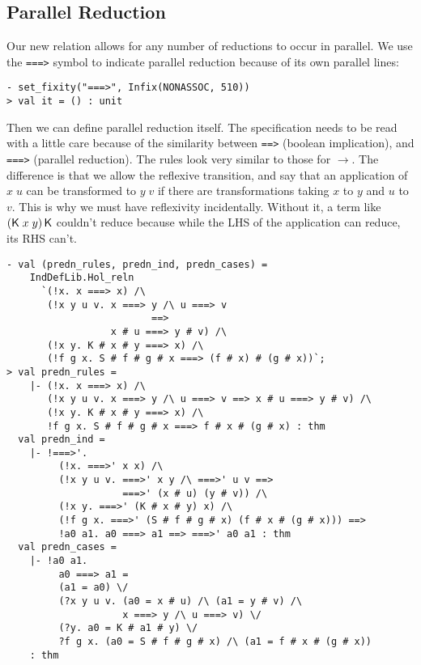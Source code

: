 \documentclass[12pt]{article}
\newcommand{\KC}{\con{K}}
\begin{document}
\subsection{Parallel Reduction}
\label{sec:Parallel-Reduction}

Our new relation allows for any number of reductions to occur in
parallel.  We use the \texttt{===>} symbol to indicate parallel
reduction because of its own parallel lines:
\begin{session}\begin{verbatim}
- set_fixity("===>", Infix(NONASSOC, 510))
> val it = () : unit
\end{verbatim}\end{session}
    Then we can define parallel reduction itself.  The specification
    needs to be read with a little care because of the similarity
    between \texttt{==>} (boolean implication), and \texttt{===>}
    (parallel reduction).  The rules look very similar to those for
    $\rightarrow$.  The difference is that we allow the reflexive
    transition, and say that an application of $x\;u$ can be
    transformed to $y\;v$ if there are transformations taking $x$ to
    $y$ and $u$ to $v$.  This is why we must have reflexivity
    incidentally.  Without it, a term like $(\KC\;x\;y)\,\KC$ couldn't
    reduce because while the LHS of the application can reduce, its
    RHS can't.
\begin{session}\begin{verbatim}
- val (predn_rules, predn_ind, predn_cases) =
    IndDefLib.Hol_reln
      `(!x. x ===> x) /\
       (!x y u v. x ===> y /\ u ===> v
                         ==>
                  x # u ===> y # v) /\
       (!x y. K # x # y ===> x) /\
       (!f g x. S # f # g # x ===> (f # x) # (g # x))`;
> val predn_rules =
    |- (!x. x ===> x) /\
       (!x y u v. x ===> y /\ u ===> v ==> x # u ===> y # v) /\
       (!x y. K # x # y ===> x) /\
       !f g x. S # f # g # x ===> f # x # (g # x) : thm
  val predn_ind =
    |- !===>'.
         (!x. ===>' x x) /\
         (!x y u v. ===>' x y /\ ===>' u v ==>
                    ===>' (x # u) (y # v)) /\
         (!x y. ===>' (K # x # y) x) /\
         (!f g x. ===>' (S # f # g # x) (f # x # (g # x))) ==>
         !a0 a1. a0 ===> a1 ==> ===>' a0 a1 : thm
  val predn_cases =
    |- !a0 a1.
         a0 ===> a1 =
         (a1 = a0) \/
         (?x y u v. (a0 = x # u) /\ (a1 = y # v) /\
                    x ===> y /\ u ===> v) \/
         (?y. a0 = K # a1 # y) \/
         ?f g x. (a0 = S # f # g # x) /\ (a1 = f # x # (g # x))
    : thm
\end{verbatim}\end{session}
\end{document}
